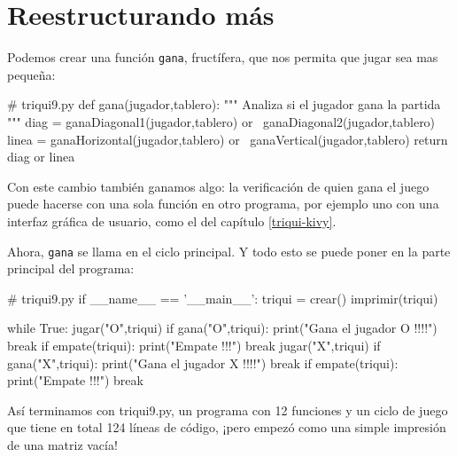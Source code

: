 \section{Reestructurando más}

Podemos crear una función \texttt{gana}, fructífera, que nos permita
que jugar sea mas pequeña:

\begin{pythoncode}
# triqui9.py
def gana(jugador,tablero):
    """ Analiza si el jugador gana la partida """
    diag = ganaDiagonal1(jugador,tablero) or \
           ganaDiagonal2(jugador,tablero)
    linea = ganaHorizontal(jugador,tablero) or \
            ganaVertical(jugador,tablero)
    return  diag or linea
\end{pythoncode}

Con este cambio también ganamos algo: la verificación de quien gana
el juego puede hacerse con una sola función en otro programa, por
ejemplo uno con una interfaz gráfica de usuario, como el del capítulo
\ref{triqui-kivy}.

Ahora, \texttt{gana} se llama en el ciclo principal. Y todo esto se
puede poner en la parte principal del programa:

\begin{pythoncode}
# triqui9.py
if __name__ == '__main__':
    triqui = crear()
    imprimir(triqui)

    while True:
        jugar("O",triqui)
        if gana("O",triqui):
            print("Gana el jugador O !!!!")
            break
        if empate(triqui):
            print("Empate !!!")
            break
        jugar("X",triqui)
        if gana("X",triqui):
            print("Gana el jugador X !!!!")
            break
        if empate(triqui):
            print("Empate !!!")
            break
\end{pythoncode}

Así terminamos con triqui9.py, un programa con 12 funciones y un ciclo
de juego que tiene en total 124 líneas de código, ¡pero empezó como
una simple impresión de una matriz vacía!

